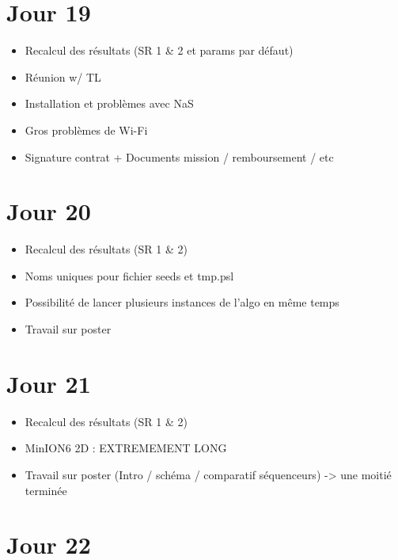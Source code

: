 \documentclass[12pt]{report}
\begin{document}
\section{Jour 19}

\begin{itemize}
  \item Recalcul des résultats (SR 1 \& 2 et params par défaut)

  \item Réunion w/ TL

  \item Installation et problèmes avec NaS

  \item Gros problèmes de Wi-Fi

  \item Signature contrat + Documents mission / remboursement / etc
\end{itemize}

\section{Jour 20}

\begin{itemize}
  \item Recalcul des résultats (SR 1 \& 2)

  \item Noms uniques pour fichier seeds et tmp.psl

  \item Possibilité de lancer plusieurs instances de l'algo en même temps

  \item Travail sur poster
\end{itemize}

\section{Jour 21}

\begin{itemize}
  \item Recalcul des résultats (SR 1 \& 2)

  \item MinION6 2D : EXTREMEMENT LONG

  \item Travail sur poster (Intro / schéma / comparatif séquenceurs) -> une moitié terminée
\end{itemize}

\section{Jour 22}
\end{document}
